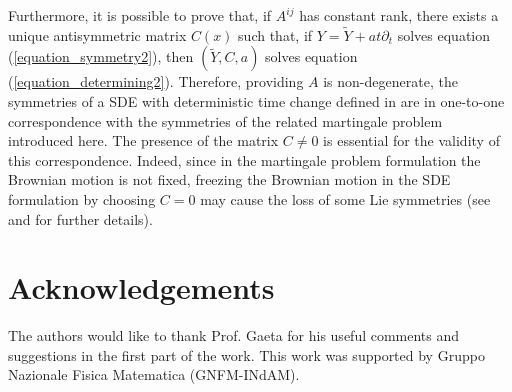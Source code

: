 \documentclass{article}[10pt]
\newcommand{\refeqn}[1]{(\ref{#1})}
\begin{document}
Furthermore, it is possible to prove that, if $A^{ij}$ has constant rank, there exists a unique antisymmetric matrix $C(x)$ such that, if $Y=\tilde{Y}+at\partial_t$
solves equation \refeqn{equation_symmetry2},  then $(\tilde{Y},C,a)$ solves equation \refeqn{equation_determining2}.
Therefore, providing $A$ is non-degenerate, the symmetries of  a SDE with deterministic time change defined in \cite{DMU1} are in one-to-one correspondence
 with the symmetries of the related martingale problem  introduced here.
The presence of the matrix $C \not =0 $ is essential for the validity of this correspondence. Indeed, since in the martingale problem formulation the Brownian motion
is not  fixed, freezing   the Brownian motion  in the SDE formulation  by choosing $C = 0$ may cause the loss of  some
Lie symmetries (see \cite{Gaeta2000} and \cite{DMU1} for further details).

\section*{Acknowledgements}

The authors would like to thank Prof. Gaeta for his  useful comments and suggestions  in the first part of the work. This work was supported by Gruppo Nazionale Fisica Matematica (GNFM-INdAM).




\end{document}
